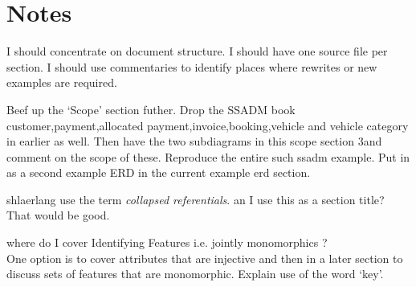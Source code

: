 \section*{Notes}
\mynote I should concentrate on document structure.
\mynote I should have one source file per section.
\mynote I should use commentaries to identify places where rewrites or new examples are required. 

\mynote Beef up the `Scope' section futher. 
Drop the SSADM book customer,payment,allocated payment,invoice,booking,vehicle and vehicle category in earlier as well. Then have the two subdiagrams in this scope section 3and comment on the scope of these.
Reproduce the entire such ssadm example. Put in as a second example ERD in the current example erd section.
\begin{noteforfuture}
shlaerlang use the term \textit{collapsed referentials}.
an I use this as a section title? That would be good.
\end{noteforfuture}


\mynote where do I cover Identifying Features i.e. jointly monomorphics ?\\
One option is to cover attributes that are injective and then in a later section to discuss sets of features that are monomorphic. Explain use of the word `key'. 

